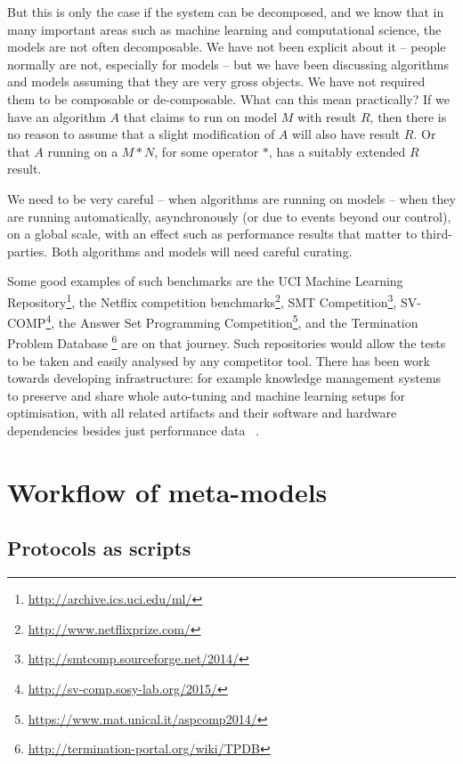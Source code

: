 \documentclass[conference]{IEEEtran}
\begin{document}
But this is only the case if the system can be decomposed, and we know
that in many important areas such as machine learning and computational
science, the models are not often decomposable.  We have not
been explicit about it -- people normally are not, especially for
models -- but we have been discussing algorithms and models assuming
that they are very gross objects. We have not required them to be
composable or de-composable. What can this mean practically? If we
have an algorithm $A$ that claims to run on model $M$ with result $R$,
then there is no reason to assume that a slight modification of $A$
will also have result $R$. Or that $A$ running on a $M * N$, for some
operator $*$, has a suitably extended $R$ result.

We need to be very careful -- when algorithms are running on models --
when they are running automatically, asynchronously (or due to events
beyond our control), on a global scale, with an effect such as
performance results that matter to third-parties. Both algorithms and
models will need careful curating.

Some good examples of such benchmarks are the UCI Machine Learning
Repository\footnote{\url{http://archive.ics.uci.edu/ml/}}, the Netflix
competition benchmarks\footnote{\url{http://www.netflixprize.com/}},
SMT Competition\footnote{\url{http://smtcomp.sourceforge.net/2014/}},
SV-COMP\footnote{\url{http://sv-comp.sosy-lab.org/2015/}}, the
Answer Set Programming
Competition\footnote{\url{https://www.mat.unical.it/aspcomp2014/}},
and the Termination Problem Database 
\footnote{\url{http://termination-portal.org/wiki/TPDB}} are
on that journey. Such repositories would allow the tests to be taken
and easily analysed by any competitor tool. There has been work
towards developing infrastructure: for example knowledge management
systems to preserve and share whole auto-tuning and machine learning
setups for optimisation, with all related artifacts and their software
and hardware dependencies besides just performance data
~\cite{fursin-et-al:2014}.


\section{Workflow of meta-models}

\subsection{Protocols as scripts}
\end{document}
